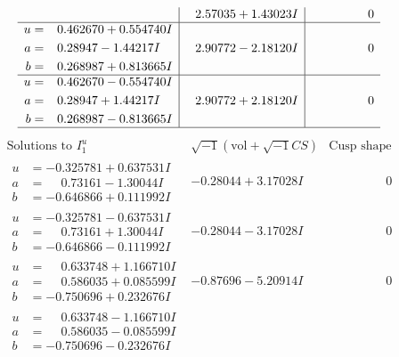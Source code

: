 \documentclass[1p]{elsarticle_modified}
\theoremstyle{definition}
\newcommand{\I}{\sqrt{-1}}
\begin{document}
$$\begin{array}{c|c|c}
 & \phantom{-}2.57035 + 1.43023 I & \phantom{-0.000000 } 0 \\ \hline\begin{aligned}
u &= \phantom{-}0.462670 + 0.554740 I \\
a &= \phantom{-}0.28947 - 1.44217 I \\
b &= \phantom{-}0.268987 + 0.813665 I\end{aligned}
 & \phantom{-}2.90772 - 2.18120 I & \phantom{-0.000000 } 0 \\ \hline\begin{aligned}
u &= \phantom{-}0.462670 - 0.554740 I \\
a &= \phantom{-}0.28947 + 1.44217 I \\
b &= \phantom{-}0.268987 - 0.813665 I\end{aligned}
 & \phantom{-}2.90772 + 2.18120 I & \phantom{-0.000000 } 0\\
 \hline 
 \end{array}$$\newpage$$\begin{array}{c|c|c}  
\text{Solutions to }I^u_{1}& \I (\text{vol} + \sqrt{-1}CS) & \text{Cusp shape}\\
 \hline 
\begin{aligned}
u &= -0.325781 + 0.637531 I \\
a &= \phantom{-}0.73161 - 1.30044 I \\
b &= -0.646866 + 0.111992 I\end{aligned}
 & -0.28044 + 3.17028 I & \phantom{-0.000000 } 0 \\ \hline\begin{aligned}
u &= -0.325781 - 0.637531 I \\
a &= \phantom{-}0.73161 + 1.30044 I \\
b &= -0.646866 - 0.111992 I\end{aligned}
 & -0.28044 - 3.17028 I & \phantom{-0.000000 } 0 \\ \hline\begin{aligned}
u &= \phantom{-}0.633748 + 1.166710 I \\
a &= \phantom{-}0.586035 + 0.085599 I \\
b &= -0.750696 + 0.232676 I\end{aligned}
 & -0.87696 - 5.20914 I & \phantom{-0.000000 } 0 \\ \hline\begin{aligned}
u &= \phantom{-}0.633748 - 1.166710 I \\
a &= \phantom{-}0.586035 - 0.085599 I \\
b &= -0.750696 - 0.232676 I\end{aligned}

\end{array}$$
\end{document}

